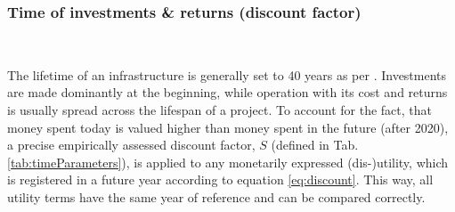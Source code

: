 \begin{comment}
\begin{table}[H]
	\begin{tabular}{l | L | L}
		\centering Simulation parameter & \multicolumn{1}{|c|}{\text{Variable}} & \multicolumn{1}{|c}{\centering \text{Derivation}} \\ \hline \hline
		$\Delta$MPT person dist. & \Delta D_{\text{pers,MPT}} \text{ [km/d]} & D_{\text{pers,MPT|metroScenario}} - D_{\text{pers,MPT|baseScenario}} \\
		$\Delta$PT person dist. & \Delta D_{\text{pers,PT}} \text{ [km/d]} & D_{\text{pers,PT|metroScenario}} - D_{\text{pers,PT|baseScenario}}\\
		$\Delta$Total PT travel time & \Delta t_{pers,PT} \text{ [s/a]} & t_{\text{pers,PT|metroScenario}} - t_{\text{pers,PT|baseScenario}}\\
		$\Delta$Total MPT travel time & \Delta t_{pers,MPT} \text{ [s/a]} & t_{\text{pers,MPT|metroScenario}} - t_{\text{pers,MPT|baseScenario}}\\
		Metro vehicle dist. & D_{veh} \text{ [km/a]} & \sum_{veh}^{} \text{routeLength}\cdot \text{nDailyDepartures}_{veh} \cdot 365 \\ \hline
	\end{tabular}
	\captionsetup{justification=centering}
	\caption{Key data from traffic simulation for utility calculations}
	\label{tab:simdata}
\end{table}
\end{comment}

\subsubsection{Time of investments \& returns (discount factor)}\mbox{}\\
\vspace{-5ex} 

The lifetime of an infrastructure is generally set to 40 years as per \citet{VSS_Norm_641820_2006Own}. Investments are made dominantly at the beginning, while operation with its cost and returns is usually spread across the lifespan of a project. To account for the fact, that money spent today is valued higher than money spent in the future (after 2020), a precise empirically assessed discount factor, $S$ \citet{VSS_Norm_KNA641821_2006} (defined in Tab. \ref{tab:timeParameters}), is applied to any monetarily expressed (dis-)utility, which is registered in a future year  according to equation \ref{eq:discount}. This way, all utility terms have the same year of reference and can be compared correctly.

